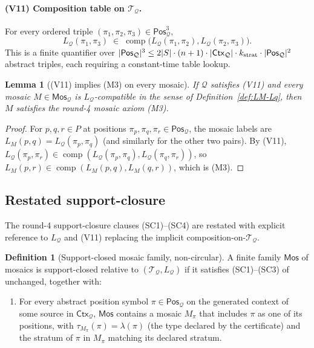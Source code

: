 \documentclass[11pt]{article}
\newtheorem{lemma}[theorem]{Lemma}
\theoremstyle{definition}
\newtheorem{definition}[theorem]{Definition}
\theoremstyle{remark}
\newcommand{\comp}{\operatorname{comp}}
\newcommand{\Mos}{\mathsf{Mos}}
\newcommand{\Ctx}{\mathsf{Ctx}}
\newcommand{\Pos}{\mathsf{Pos}}
\newcommand{\Q}{\mathcal{Q}}
\newcommand{\T}{\mathcal{T}}
\begin{document}
\paragraph{(V11) Composition table on $\T_\Q$.}
For every ordered triple $(\pi_1,\pi_2,\pi_3)\in\Pos_\Q^3$,
\[
  L_\Q(\pi_1,\pi_3)\;\in\;\comp\bigl(L_\Q(\pi_1,\pi_2),
                                       L_\Q(\pi_2,\pi_3)\bigr).
\]
This is a finite quantifier over $|\Pos_\Q|^3\leq 2|S|\cdot(n+1)
\cdot|\Ctx_\Q|\cdot k_{\rm strat}\cdot |\Pos_\Q|^2$
abstract triples, each requiring a constant-time table lookup.

\begin{lemma}[(V11) implies (M3) on every mosaic]\label{lem:V11-implies-M3}
If $\Q$ satisfies (V11) and every mosaic $M\in\Mos_\Q$ is
$L_\Q$-compatible in the sense of Definition~\ref{def:LM-Lq}, then
$M$ satisfies the round-4 mosaic axiom (M3).
\end{lemma}

\begin{proof}
For $p,q,r\in P$ at positions $\pi_p,\pi_q,\pi_r\in\Pos_\Q$, the
mosaic labels are $L_M(p,q)=L_\Q(\pi_p,\pi_q)$ (and similarly for
the other two pairs).  By (V11), $L_\Q(\pi_p,\pi_r)\in\comp(L_\Q(\pi_p,\pi_q),
L_\Q(\pi_q,\pi_r))$, so $L_M(p,r)\in\comp(L_M(p,q),L_M(q,r))$,
which is (M3).
\end{proof}

\subsection{Restated support-closure}

The round-4 support-closure clauses (SC1)--(SC4) are restated with
explicit reference to $L_\Q$ and (V11) replacing the implicit
composition-on-$\T_\Q$.

\begin{definition}[Support-closed mosaic family, non-circular]\label{def:support-closed-v3}
A finite family $\Mos$ of mosaics is support-closed relative to
$(\T_\Q,L_\Q)$ if it satisfies (SC1)--(SC3) of \cite{GPT55Repaired}
unchanged, together with:
\begin{enumerate}[label=(SC4$'$)]
\item For every abstract position symbol $\pi\in\Pos_\Q$ on the
generated context of some source in $\Ctx_\Q$, $\Mos$ contains a
mosaic $M_\pi$ that includes $\pi$ as one of its positions, with
$\tau_{M_\pi}(\pi)=\lambda(\pi)$ (the type declared by the certificate)
and the stratum of $\pi$ in $M_\pi$ matching its declared stratum.
\end{enumerate}
\end{definition}
\end{document}

